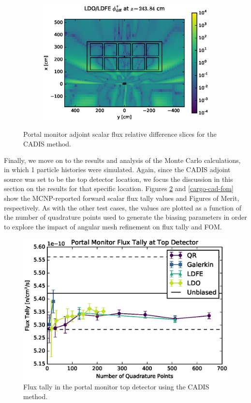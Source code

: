 \begin{figure}[!htb]
\ContinuedFloat
\begin{subfigure}{\textwidth}
\centering
\includegraphics[max height=0.445\textheight]
{img/cargo-plots/cad-adj/flux-diff-rel-ldfe01.eps}
\end{subfigure}
\caption{Portal monitor adjoint scalar flux relative difference slices for the CADIS 
         method.}
\label{cargo-cad-adj-diff-rel}
\end{figure}

Finally, we move on to the results and analysis of the Monte Carlo calculations, in which
1 particle histories were simulated.
Again, since the CADIS adjoint source was set to be the top detector location, we
focus the discussion in this section on the results for that specific location.
Figures \ref{cargo-cad-tally} and \ref{cargo-cad-fom} show the MCNP-reported forward scalar 
flux tally values and Figures of Merit, respectively. As with the other test cases, the
values are plotted as a function of the number of quadrature points used to generate
the biasing parameters in order to explore the impact of angular mesh refinement on
flux tally and FOM.

\begin{figure}[!htb]
\centering
\includegraphics[max height=0.445\textheight]{img/cargo-plots/mcnp/cadis-tally-14.eps}
\caption{Flux tally in the portal monitor top detector using the CADIS method.}
\label{cargo-cad-tally}
\end{figure}

